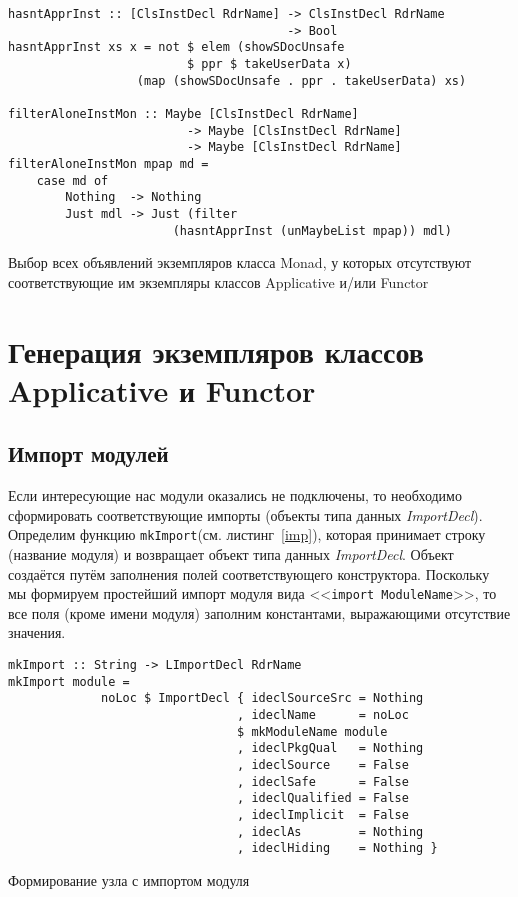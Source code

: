 \begin{ListingEnv}[htb]
\begin{lstlisting}
hasntApprInst :: [ClsInstDecl RdrName] -> ClsInstDecl RdrName
                                       -> Bool
hasntApprInst xs x = not $ elem (showSDocUnsafe 
                         $ ppr $ takeUserData x) 
                  (map (showSDocUnsafe . ppr . takeUserData) xs)

filterAloneInstMon :: Maybe [ClsInstDecl RdrName]
                         -> Maybe [ClsInstDecl RdrName]
                         -> Maybe [ClsInstDecl RdrName]
filterAloneInstMon mpap md = 
    case md of
        Nothing  -> Nothing
        Just mdl -> Just (filter 
                       (hasntApprInst (unMaybeList mpap)) mdl)
\end{lstlisting}
\caption{Выбор всех объявлений экземпляров класса Monad, у которых отсутствуют соответствующие им экземпляры классов Applicative и/или Functor}\label{p6}
\end{ListingEnv}
\section{Генерация экземпляров классов Applicative и
Functor}
\subsection{Импорт модулей}
Если интересующие нас модули оказались не подключены, то необходимо сформировать соответствующие импорты (объекты типа данных \textit{ImportDecl}). Определим функцию \lstinline{mkImport}(см. листинг~\ref{imp}), которая принимает строку (название модуля) и возвращает объект типа данных \textit{ImportDecl}. Объект создаётся путём заполнения полей соответствующего конструктора. Поскольку мы формируем простейший импорт модуля вида <<\lstinline{import ModuleName}>>, то все поля (кроме имени модуля) заполним константами, выражающими отсутствие значения.

\begin{ListingEnv}[h]
\begin{lstlisting}
mkImport :: String -> LImportDecl RdrName
mkImport module = 
             noLoc $ ImportDecl { ideclSourceSrc = Nothing
                                , ideclName      = noLoc 
                                $ mkModuleName module
                                , ideclPkgQual   = Nothing
                                , ideclSource    = False
                                , ideclSafe      = False
                                , ideclQualified = False
                                , ideclImplicit  = False
                                , ideclAs        = Nothing
                                , ideclHiding    = Nothing }
\end{lstlisting}
\caption{Формирование узла с импортом модуля}\label{imp}
\end{ListingEnv}

